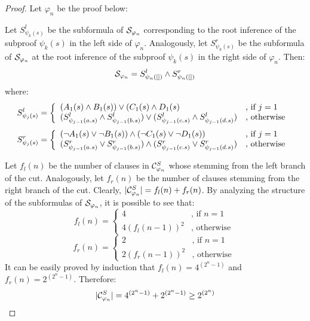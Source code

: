 \documentclass{llncs}
\begin{document}
\begin{proof}
Let $\varphi_n$ be the proof below:
\begin{prooftree}
		 
\end{prooftree}

Let $S_{\psi_k(s)}^l$ be the subformula of $\cutpertstruct{\varphi_n}$ corresponding to the root inference of the subproof $\psi_k(s)$ in the left side of $\varphi_n$. Analogously, let $S_{\psi_k(s)}^r$ be the subformula of $\cutpertstruct{\varphi_n}$ at the root inference of the subproof $\psi_k(s)$ in the right side of $\varphi_n$. Then:
$$
\cutpertstruct{\varphi_n} = S_{\psi_n([])}^l \structplus S_{\psi_n([])}^r
$$
%
where:
$$
S_{\psi_j(s)}^l = \left\{ \begin{array}{ll}
(A_1(s) \structplus B_1(s)) \structtimes (C_1(s) \structplus D_1(s) & \textrm{, if } j=1 \\
(S_{\psi_{j-1}(a.s)}^l \structplus S_{\psi_{j-1}(b.s)}^l) \structtimes (S_{\psi_{j-1}(c.s)}^l \structplus S_{\psi_{j-1}(d.s)}^l) & \textrm{, otherwise }
\end{array}\right.
$$
$$
S_{\psi_j(s)}^r = \left\{ \begin{array}{ll}
  (\neg A_1(s) \structtimes \neg B_1(s)) 
  \structplus
  (\neg C_1(s) \structtimes \neg D_1(s))  & \textrm{, if } j=1 \\
  (S_{\psi_{j-1}(a.s)}^r \structtimes S_{\psi_{j-1}(b.s)}^r) 
  \structplus
  (S_{\psi_{j-1}(c.s)}^r \structtimes S_{\psi_{j-1}(d.s)}^r) & \textrm{, otherwise }
\end{array}\right.
$$

\noindent
Let $f_l(n)$ be the number of clauses in $\clausesetStandard{\varphi_n}$ whose stemming from the left branch of the cut. Analogously, let $f_r(n)$ be the number of clauses stemming from the right branch of the cut. Clearly, $|\clausesetStandard{\varphi_n}| = f_l(n) + f_r(n)$. By analyzing the structure of the subformulas of $\cutpertstruct{\varphi_n}$, it is possible to see that:
$$
f_l(n) = \left\{ \begin{array}{ll}
4 & \textrm{, if } n=1 \\
4 (f_l(n-1))^2 & \textrm{, otherwise }
\end{array}\right.
$$
$$
f_r(n) = \left\{ \begin{array}{ll}
2 & \textrm{, if } n=1 \\
2 (f_r(n-1))^2 & \textrm{, otherwise }
\end{array}\right.
$$
%
It can be easily proved by induction that $f_l(n) = 4^{(2^n - 1)}$ and $f_r(n) = 2^{(2^n - 1)}$. Therefore:
$$
|\clausesetStandard{\varphi_n}| = 4^{(2^n - 1)} + 2^{(2^n - 1)} \geq 2^{(2^n)} 
$$
\hfill\QED
\end{proof}
\end{document}
